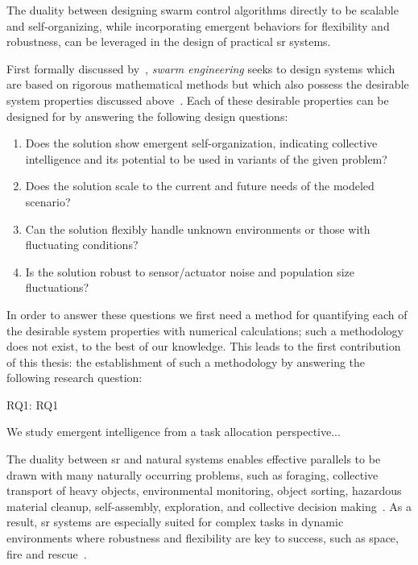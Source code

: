 The duality between designing swarm control algorithms directly to be scalable
and self-organizing, while incorporating emergent behaviors for flexibility and
robustness, can be leveraged in the design of practical \gls{sr}
systems.

First formally discussed by~\cite{Winfield2005}, \emph{swarm engineering} seeks
to design systems which are based on rigorous mathematical methods but which
also possess the desirable system properties discussed
above~\cite{Brambilla2013a}.  Each of these desirable properties can be designed
for by answering the following design questions:
%
\begin{enumerate}
\item {Does the solution show emergent self-organization, indicating collective
    intelligence and its potential to be used in variants of the given problem?
  }
\item{Does the solution scale to the current and future needs of the modeled
    scenario?}
\item {Can the solution flexibly handle unknown environments or those with
    fluctuating conditions?}

\item {Is the solution robust to sensor/actuator noise and population size
    fluctuations? %
  }
\end{enumerate}
%
In order to answer these questions we first need a method for quantifying each
of the desirable system properties with numerical calculations; such a
methodology does not exist, to the best of our knowledge. This leads to the
first contribution of this thesis: the establishment of such a methodology by
answering the following research question:

\noindent
\gls{RQ1}: \glsdesc{RQ1}


We study emergent intelligence from a task allocation perspective...


The duality between \gls{sr} and natural systems enables effective parallels to
be drawn with many naturally occurring problems, such as foraging, collective
transport of heavy objects, environmental monitoring, object sorting, hazardous
material cleanup, self-assembly, exploration, and collective decision
making~\cite{Hecker2015,Kumar2003,CarrilloZapata2020}.  As a result, \gls{sr}
systems are especially suited for complex tasks in dynamic environments where
robustness and flexibility are key to success, such as space, fire and
rescue~\cite{Rouff2004,CarrilloZapata2020}.

